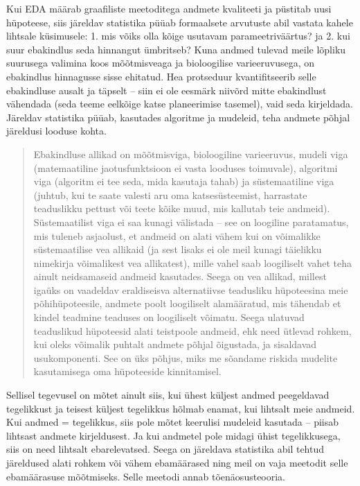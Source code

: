 \documentclass[]{book}
\begin{document}
Kui EDA määrab graafiliste meetoditega andmete kvaliteeti ja püstitab uusi hüpoteese, siis järeldav statistika püüab formaalsete arvutuste abil vastata kahele lihtsale küsimusele: 1. mis võiks olla kõige usutavam parameetriväärtus? ja 2. kui suur ebakindlus seda hinnangut ümbritseb? Kuna andmed tulevad meile lõpliku suurusega valimina koos mõõtmisveaga ja bioloogilise varieeruvusega, on ebakindlus hinnagusse sisse ehitatud. Hea protseduur kvantifitseerib selle ebakindluse ausalt ja täpselt -- siin ei ole eesmärk niivõrd mitte ebakindlust vähendada (seda teeme eelkõige katse planeerimise tasemel), vaid seda kirjeldada.
Järeldav statistika püüab, kasutades algoritme ja mudeleid, teha andmete põhjal järeldusi looduse kohta.

\begin{quote}
Ebakindluse allikad on mõõtmisviga, bioloogiline varieeruvus, mudeli viga (matemaatiline jaotusfunktsioon ei vasta looduses toimuvale), algoritmi viga (algoritm ei tee seda, mida kasutaja tahab) ja süstemaatiline viga (juhtub, kui te saate valesti aru oma katsesüsteemist, harrastate teaduslikku pettust või teete kõike muud, mis kallutab teie andmeid). Süstemaatilist viga ei saa kunagi välistada -- see on loogiline paratamatus, mis tuleneb asjaolust, et andmeid on alati vähem kui on võimalikke süstemaatilise vea allikaid (ja sest lisaks ei ole meil kunagi täielikku nimekirja võimalikest vea allikatest), mille vahel saab loogiliselt vahet teha ainult neidsamaseid andmeid kasutades. Seega on vea allikad, millest igaüks on vaadeldav eraldiseisva alternatiivse teadusliku hüpoteesina meie põhihüpoteesile, andmete poolt loogiliselt alamääratud, mis tähendab et kindel teadmine teaduses on loogiliselt võimatu. Seega ulatuvad teaduslikud hüpoteesid alati teistpoole andmeid, ehk need ütlevad rohkem, kui oleks võimalik puhtalt andmete põhjal õigustada, ja sisaldavad usukomponenti. See on üks põhjus, miks me sõandame riskida mudelite kasutamisega oma hüpoteeside kinnitamisel.
\end{quote}

Sellisel tegevusel on mõtet ainult siis, kui ühest küljest andmed peegeldavad tegelikkust ja teisest küljest tegelikkus hõlmab enamat, kui lihtsalt meie andmeid.
Kui andmed = tegelikkus, siis pole mõtet keerulisi mudeleid kasutada -- piisab lihtsast andmete kirjeldusest.
Ja kui andmetel pole midagi ühist tegelikkusega, siis on need lihtsalt ebarelevatsed.
Seega on järeldava statistika abil tehtud järeldused alati rohkem või vähem ebamäärased ning meil on vaja meetodit selle ebamäärasuse mõõtmiseks. Selle meetodi annab tõenäosusteooria.
\end{document}
